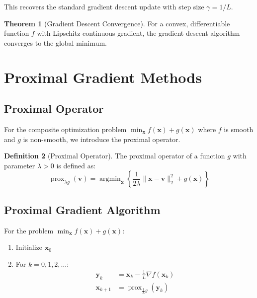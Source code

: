 \documentclass[12pt]{article}
\renewcommand{\vec}[1]{\mathbf{#1}}
\DeclareMathOperator{\argmin}{argmin}
\DeclareMathOperator{\prox}{prox}
\newcommand{\norm}[1]{\lVert#1\rVert}
\theoremstyle{definition}
\newtheorem{theorem}{Theorem}[section]
\newtheorem{definition}[theorem]{Definition}
\begin{document}
This recovers the standard gradient descent update with step size $\gamma = 1/L$.

\begin{theorem}[Gradient Descent Convergence]
    For a convex, differentiable function $f$ with Lipschitz continuous gradient, the gradient descent algorithm converges to the global minimum.
\end{theorem}

\newpage

\section{Proximal Gradient Methods}

\subsection{Proximal Operator}

For the composite optimization problem $\min_{\vec{x}} f(\vec{x}) + g(\vec{x})$ where $f$ is smooth and $g$ is non-smooth, we introduce the proximal operator.

\begin{definition}[Proximal Operator]
    The proximal operator of a function $g$ with parameter $\lambda > 0$ is defined as:
    \begin{equation}
        \prox_{\lambda g}(\vec{v}) = \argmin_{\vec{x}} \left\{\frac{1}{2\lambda}\norm{\vec{x} - \vec{v}}_2^2 + g(\vec{x})\right\}
    \end{equation}
\end{definition}

\subsection{Proximal Gradient Algorithm}


\begin{algorithm}
    For the problem $\min_{\vec{x}} f(\vec{x}) + g(\vec{x})$:
    \begin{enumerate}
        \item Initialize $\vec{x}_0$
        \item For $k = 0, 1, 2, \ldots$:
              \begin{align}
                  \vec{y}_k     & = \vec{x}_k - \frac{1}{L}\nabla f(\vec{x}_k) \\
                  \vec{x}_{k+1} & = \prox_{\frac{1}{L}g}(\vec{y}_k)
              \end{align}
    \end{enumerate}
\end{algorithm}
\end{document}
